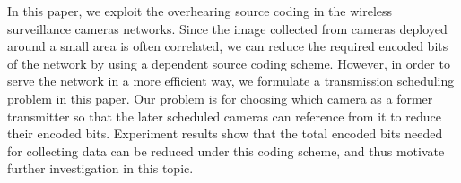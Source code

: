 {\color{blue}
In this paper, we exploit the overhearing source coding in the wireless
surveillance cameras networks.
Since the image collected from cameras deployed around a small area is often
correlated, we can reduce the required encoded bits of the network by using a
dependent source coding scheme.
However, in order to serve the network in a more efficient way, we formulate a
transmission scheduling problem in this paper.
Our problem is for choosing which camera as a former transmitter so that the
later scheduled cameras can reference from it to reduce their encoded bits.
Experiment results show that the total encoded bits needed for collecting data
can be reduced under this coding scheme, and thus motivate further
investigation in this topic.
}